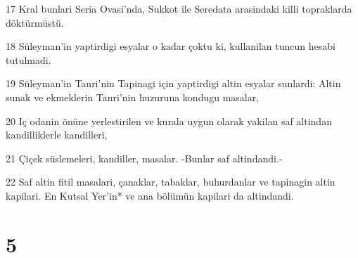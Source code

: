 \par 17 Kral bunlari Seria Ovasi'nda, Sukkot ile Seredata arasindaki killi topraklarda döktürmüstü.
\par 18 Süleyman'in yaptirdigi esyalar o kadar çoktu ki, kullanilan tuncun hesabi tutulmadi.
\par 19 Süleyman'in Tanri'nin Tapinagi için yaptirdigi altin esyalar sunlardi: Altin sunak ve ekmeklerin Tanri'nin huzuruna kondugu masalar,
\par 20 Iç odanin önüne yerlestirilen ve kurala uygun olarak yakilan saf altindan kandilliklerle kandilleri,
\par 21 Çiçek süslemeleri, kandiller, masalar. -Bunlar saf altindandi.-
\par 22 Saf altin fitil masalari, çanaklar, tabaklar, buhurdanlar ve tapinagin altin kapilari. En Kutsal Yer'in* ve ana bölümün kapilari da altindandi.

\chapter{5}

